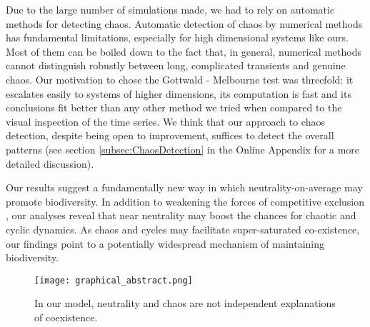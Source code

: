 Due to the large number of simulations made, we had to rely on automatic methods for detecting chaos. Automatic detection of chaos by numerical methods has fundamental limitations, especially for high dimensional systems like ours. Most of them can be boiled down to the fact that, in general, numerical methods cannot distinguish robustly between long, complicated transients and genuine chaos. Our motivation to chose the Gottwald - Melbourne test \citep{Gottwald2009} was threefold: it escalates easily to systems of higher dimensions, its computation is fast and its conclusions fit better than any other method we tried when compared to the visual inspection of the time series. We think that our approach to chaos detection, despite being open to improvement, suffices to detect the overall patterns (see section \ref{subsec:ChaosDetection} in the Online Appendix for a more detailed discussion).

Our results suggest a fundamentally new way in which neutrality-on-average may promote biodiversity. In addition to weakening the forces of competitive exclusion \citep{Scheffer2018}, our analyses reveal that near neutrality may boost the chances for chaotic and cyclic dynamics. As chaos and cycles may facilitate super-saturated co-existence, our findings point to a potentially widespread mechanism of maintaining biodiversity.

\begin{figure}
	\begin{center}
		\texttt{[image: graphical\_abstract.png]}
	\end{center}
	\caption{In our model, neutrality and chaos are not independent explanations of coexistence.}
	\label{fig:GapInKnowledge}
\end{figure}
